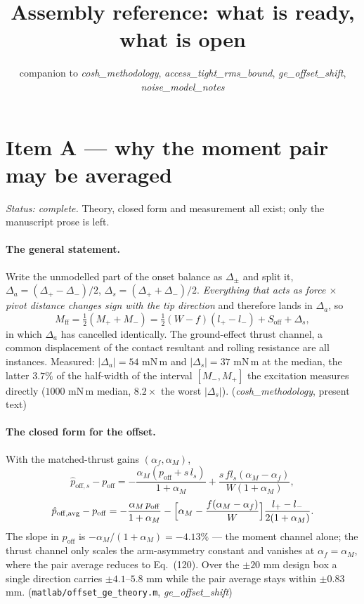 \documentclass[10pt]{article}
\title{\vspace{-16mm}\textbf{Assembly reference: what is ready, what is
open}\vspace{-3mm}}
\date{\small companion to \emph{cosh\_methodology},
\emph{access\_tight\_rms\_bound}, \emph{ge\_offset\_shift},
\emph{noise\_model\_notes}}
\newcommand{\scr}[1]{\texttt{\small #1}}
\begin{document}
\maketitle

\section{Item A --- why the moment pair may be averaged}

\emph{Status: complete.} Theory, closed form and measurement all
exist; only the manuscript prose is left.

\paragraph{The general statement.} Write the unmodelled part of the
onset balance as $\Delta_\pm$ and split it,
$\Delta_a = (\Delta_+-\Delta_-)/2$, $\Delta_s = (\Delta_++\Delta_-)/2$.
\emph{Everything that acts as force $\times$ pivot distance changes
sign with the tip direction} and therefore lands in $\Delta_a$, so
\begin{equation*}
  M_{\mathrm{ff}} = \tfrac12 (M_+ + M_-)
  = \tfrac12 (W-f)(l_+-l_-) + S_{\mathrm{off}} + \Delta_s ,
\end{equation*}
in which $\Delta_a$ has cancelled identically. The ground-effect
thrust channel, a common displacement of the contact resultant and
rolling resistance are all instances. Measured:
$|\Delta_a| = 54$ mN\,m and $|\Delta_s| = 37$ mN\,m at the median, the
latter $3.7\%$ of the half-width of the interval $[M_-,M_+]$ the
excitation measures directly ($1000$ mN\,m median, $8.2\times$ the
worst $|\Delta_s|$). \hfill (\emph{cosh\_methodology}, present text)

\paragraph{The closed form for the offset.} With the matched-thrust
gains $(\alpha_f,\alpha_M)$,
\begin{equation*}
  \hat p_{\mathrm{off},s} - p_{\mathrm{off}}
  = -\frac{\alpha_M (p_{\mathrm{off}} + s\,l_s)}{1+\alpha_M}
    + \frac{s\,f l_s (\alpha_M-\alpha_f)}{W(1+\alpha_M)},
\end{equation*}
\begin{equation*}
  \hat p_{\mathrm{off,avg}} - p_{\mathrm{off}}
  = -\frac{\alpha_M\,p_{\mathrm{off}}}{1+\alpha_M}
    - \Bigl[\alpha_M - \frac{f(\alpha_M-\alpha_f)}{W}\Bigr]
      \frac{l_+-l_-}{2(1+\alpha_M)} .
\end{equation*}
The slope in $p_{\mathrm{off}}$ is $-\alpha_M/(1+\alpha_M) = -4.13\%$
--- the moment channel alone; the thrust channel only scales the
arm-asymmetry constant and vanishes at $\alpha_f=\alpha_M$, where the
pair average reduces to Eq.~(120). Over the $\pm 20$ mm design box a
single direction carries $\pm 4.1$--$5.8$ mm while the pair average
stays within $\pm 0.83$ mm.
\hfill (\scr{matlab/offset\_ge\_theory.m}, \emph{ge\_offset\_shift})
\end{document}

